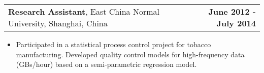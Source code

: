 \documentclass[11pt]{article}
\makeatletter
\newcommand{\headerrow}[2]
{\begin{tabular*}{\linewidth}{l@{\extracolsep{\fill}}r}
	#1 & #2 \\
\end{tabular*}
}
\makeatother
\begin{document}
\noindent\headerrow
{\textbf{Research Assistant}, East China Normal University, Shanghai, China}
{\textbf{June 2012 - July 2014}}
\noindent\begin{itemize}
    \item Participated in a statistical process control project for tobacco manufacturing. Developed quality control models for high-frequency data (GBs/hour) based on a semi-parametric regression model.
\end{itemize}


%
%
\end{document}
